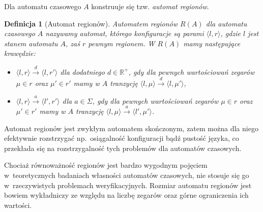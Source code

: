 \documentclass{pracamgr}
\newcommand{\pair}[2]{\langle #1, #2 \rangle}
\theoremstyle{plain}
\newtheorem{definition}{Definicja}
\begin{document}
Dla automatu czasowego $A$ konstruuje się tzw. \emph{automat
  regionów}.

\begin{definition}[Automat regionów]
  Automatem regionów $R(A)$ dla automatu czasowego $A$ nazywamy
  automat, którego konfiguracje są parami $\pair{l}{r}$, gdzie $l$
  jest stanem automatu $A$, zaś $r$ pewnym regionem. W $R(A)$ mamy
  następujące krawędzie:
  \begin{itemize}
    \item $\pair{l}{r} \stackrel{d}{\longrightarrow} \pair{l}{r'}$ dla
    dodatniego $d\in\mathbb{R}^+$, gdy dla pewnych wartościowań
    zegarów $\mu\in r$ oraz $\mu'\in r'$ mamy w $A$ tranzycję 
    $\pair{l}{\mu} \stackrel{d}{\longrightarrow} \pair{l}{\mu'}$,
    \item $\pair{l}{r} \stackrel{a}{\longrightarrow} \pair{l'}{r'}$
    dla $a\in\Sigma$, gdy dla pewnych wartościowań
    zegarów $\mu\in r$ oraz $\mu'\in r'$ mamy w $A$ tranzycję
    $\pair{l}{\mu} \stackrel{a}{\longrightarrow} \pair{l'}{\mu'}$.
  \end{itemize}

\end{definition}

Automat regionów jest zwykłym automatem skończonym, zatem można dla
niego efektywnie rozstrzygać np.~osiągalność konfiguracji bądź
pustość języka, co przekłada się na rozstrzygalność tych problemów
dla automatów czasowych.

Chociaż równoważność regionów jest bardzo wygodnym pojęciem
w~teoretycznych badaniach własności automatów czasowych, nie stosuje się
go w~rzeczywistych problemach weryfikacyjnych. Rozmiar automatu
regionów jest bowiem wykładniczy ze względu na liczbę zegarów oraz
górne ograniczenia ich wartości.
\end{document}
